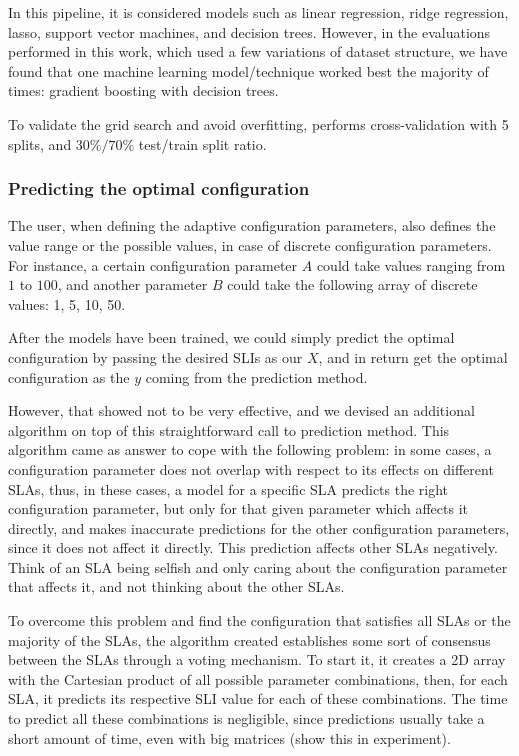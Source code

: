 In this pipeline, it is considered models such as linear regression, ridge regression, lasso, support vector machines, and decision trees. However, in the evaluations performed in this work, which used a few variations of dataset structure, we have found that one machine learning model/technique worked best the majority of times: gradient boosting with decision trees. 

To validate the grid search and avoid overfitting, \projectname{} performs cross-validation with 5 splits, and $30\%\slash70\%$ test/train split ratio.

\subsubsection{Predicting the optimal configuration}

The user, when defining the adaptive configuration parameters, also defines the value range or the possible values, in case of discrete configuration parameters. For instance, a certain configuration parameter $A$ could take values ranging from $1$ to $100$, and another parameter $B$ could take the following array of discrete values: 1, 5, 10, 50.

After the models have been trained, we could simply predict the optimal configuration by passing the desired SLIs as our $X$, and in return get the optimal configuration as the $y$ coming from the prediction method.

However, that showed not to be very effective, and we devised an additional algorithm on top of this straightforward call to prediction method. This algorithm came as answer to cope with the following problem: in some cases, a configuration parameter does not overlap with respect to its effects on different SLAs, thus, in these cases, a model for a specific SLA predicts the right configuration parameter, but only for that given parameter which affects it directly, and makes inaccurate predictions for the other configuration parameters, since it does not affect it directly. This prediction affects other SLAs negatively. Think of an SLA being selfish and only caring about the configuration parameter that affects it, and not thinking about the other SLAs.

To overcome this problem and find the configuration that satisfies all SLAs or the majority of the SLAs, the algorithm created establishes some sort of consensus between the SLAs through a voting mechanism. To start it, it creates a 2D array with the Cartesian product of all possible parameter combinations, then, for each SLA, it predicts its respective SLI value for each of these combinations. The time to predict all these combinations is negligible, since predictions usually take a short amount of time, even with big matrices (show this in experiment).

